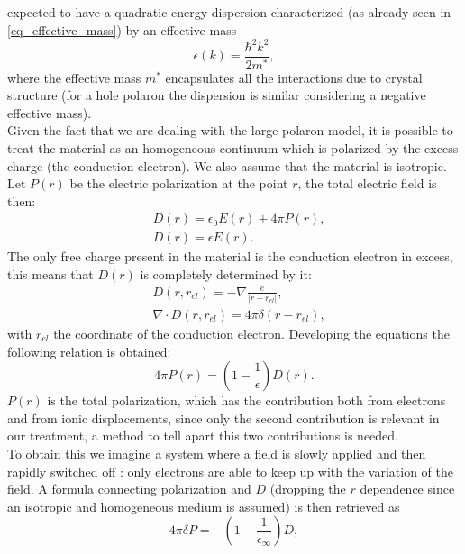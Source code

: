 \documentclass[12pt, a4paper]{report}
\numberwithin{equation}{section}
\begin{document}
expected to have a quadratic energy dispersion characterized (as already seen in \ref{eq_effective_mass}) by an effective mass
\begin{equation}
    \epsilon(k)=\frac{\hbar^2k^2}{2m^*},
\end{equation}
where the effective mass $m^*$ encapsulates all the interactions due to crystal structure (for a hole polaron the dispersion is similar 
considering a negative effective mass).\\
Given the fact that we are dealing with the large polaron model, it is possible to treat the material as an homogeneous continuum 
which is polarized by the excess charge (the conduction electron). We also assume that the material is isotropic.
Let $P(r)$ be the electric polarization at the point $r$, the total electric field is then:
\begin{equation}
\begin{split}
    &D(r)=\epsilon_0E(r)+4\pi P(r),\\
    &D(r)=\epsilon E(r).
\end{split}
\end{equation} 
The only free charge present in the material is the conduction electron in excess, this means that $D(r)$ is completely determined by it:
\begin{equation}
\begin{split}
    &D(r,r_{el})=-\nabla\frac{e}{|r-r_{el}|}, \\
    &\nabla\cdot D(r,r_{el})=4\pi\delta(r-r_{el}),
\end{split}
\end{equation}
with $r_{el}$ the coordinate of the conduction electron. Developing the equations the following relation is obtained:
\begin{equation}
    4\pi P(r) = \left(1-\frac{1}{\epsilon}\right)D(r).
\end{equation}
$P(r)$ is the total polarization, which has the contribution both from electrons and from ionic displacements, since only the second 
contribution is relevant in our treatment, a method to tell apart this two contributions is needed.\\
To obtain this we imagine a system where a field is slowly applied and then rapidly switched off \cite{haken1976quantum}: only 
electrons are able to keep up with the variation of the field. A formula connecting polarization and $D$ (dropping the $r$ dependence 
since an isotropic and homogeneous medium is assumed) is then retrieved as
\begin{equation}
    4\pi \delta P = -\left(1-\frac{1}{\epsilon_\infty}\right)D,
\end{equation}
\end{document}
